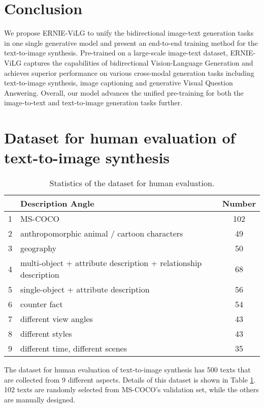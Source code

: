 \documentclass{article}
\begin{document}
\section{Conclusion}
We propose ERNIE-ViLG to unify the bidirectional image-text generation tasks in one single generative model and present an end-to-end training method for the text-to-image synthesis. Pre-trained on a large-scale image-text dataset, ERNIE-ViLG captures the capabilities of bidirectional Vision-Language Generation and achieves superior performance on various cross-modal generation tasks including text-to-image synthesis, image captioning and generative Visual Question Answering. Overall, our model advances the unified pre-training for both the image-to-text and text-to-image generation tasks further. 


  

\appendix
\section{Dataset for human evaluation of text-to-image synthesis}
\label{sec: t2i-human-eval-dataset}
\begin{table}[htb]
 \caption{Statistics of the dataset for human evaluation.}
  \centering
  \begin{tabular}{l|l|c}
    \toprule
         & Description Angle & Number \\
    \midrule
    1   &  MS-COCO & 102 \\  \midrule
    2   &  anthropomorphic animal / cartoon characters & 49 \\  \midrule
    3   &  geography & 50 \\    \midrule
    4   &  multi-object + attribute description + relationship description & 68 \\  \midrule
    5   &  single-object + attribute description & 56 \\    \midrule
    6   &  counter fact   & 54 \\ \midrule
    7   &  different view angles    & 43 \\ \midrule
    8   &  different styles & 43 \\ \midrule
    9   &  different time, different scenes & 35 \\ \midrule
  \end{tabular}
  \label{tab: app-zero-t2i-human-data}
\end{table}
The dataset for human evaluation of text-to-image synthesis has 500 texts that are collected from 9 different aspects. Details of this dataset is shown in Table \ref{tab: app-zero-t2i-human-data}. 102 texts are randomly selected from MS-COCO's validation set, while the others are manually designed. 
\end{document}
